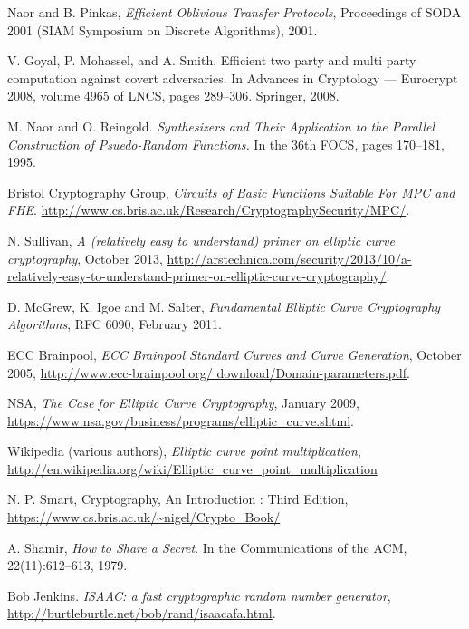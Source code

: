 \documentclass[ %
                    author={Nicholas Tutte},
                supervisor={Prof. Nigel Smart},
                    degree={MEng},
                     title={Secure Two Party Computation},
                  subtitle={A practical comparison of recent protocols},
                      type={Research - GG1K},
                      year={2015} ]{dissertation}
\begin{document}
\begin{thebibliography}{99}
			Naor and B. Pinkas, \emph{Efficient Oblivious Transfer Protocols}, Proceedings of SODA 2001 (SIAM Symposium on Discrete Algorithms), 2001.

			V. Goyal, P. Mohassel, and A. Smith.
			Efficient two party and multi party computation against covert adversaries.
			In Advances in Cryptology — Eurocrypt 2008, volume 4965 of LNCS,
			pages 289–306. Springer,
			2008.

			M. Naor and O. Reingold.
			\emph{Synthesizers and Their Application to the Parallel Construction of Psuedo-Random Functions.}
			In the 36th FOCS,
			pages 170–181,
			1995.

			Bristol Cryptography Group,
			\emph{Circuits of Basic Functions Suitable For MPC and FHE}.  \url{http://www.cs.bris.ac.uk/Research/CryptographySecurity/MPC/}. 

			N. Sullivan,
			\emph{A (relatively easy to understand) primer on elliptic curve cryptography},
			October 2013,
			\url{http://arstechnica.com/security/2013/10/a-relatively-easy-to-understand-primer-on-elliptic-curve-cryptography/}.

			D. McGrew, K. Igoe and M. Salter,
			\emph{Fundamental Elliptic Curve Cryptography Algorithms},
			RFC 6090,
			February 2011.

			ECC Brainpool, \emph{ECC Brainpool Standard Curves and Curve Generation},
			October 2005, \url{http://www.ecc-brainpool.org/
			download/Domain-parameters.pdf}.

			NSA,
			\emph{The Case for Elliptic Curve Cryptography},
			January 2009,
			\url{https://www.nsa.gov/business/programs/elliptic_curve.shtml}.

			Wikipedia (various authors),
			\emph{Elliptic curve point multiplication},
			\url{http://en.wikipedia.org/wiki/Elliptic_curve_point_multiplication}

			N. P. Smart,
			Cryptography, An Introduction : Third Edition,
			\url{https://www.cs.bris.ac.uk/~nigel/Crypto_Book/}
		
			A. Shamir,
			\emph{How to Share a Secret}.
			In the Communications of the ACM,
			22(11):612–613,
			1979.

			Bob Jenkins. \emph{ISAAC: a fast cryptographic random number generator},
			\url{http://burtleburtle.net/bob/rand/isaacafa.html}.

	\end{thebibliography}
\end{document}
